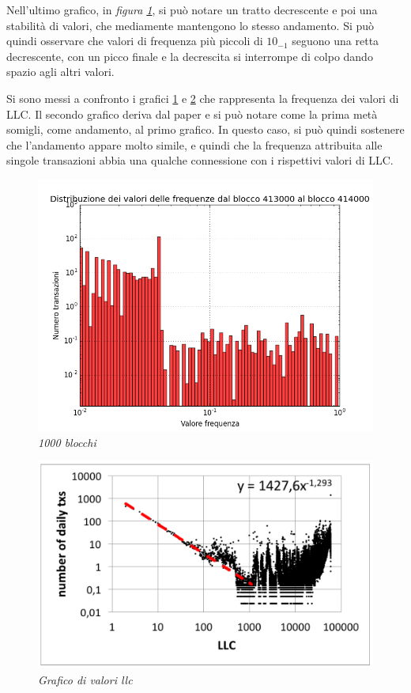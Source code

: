 Nell'ultimo grafico, in \textit{figura \ref{fig:hist1000b}}, si può notare un tratto decrescente e poi una stabilità di valori, che mediamente mantengono lo stesso andamento. Si può quindi osservare che valori di frequenza più piccoli di $10_{-1}$ seguono una retta decrescente, con un picco finale e la decrescita si interrompe di colpo dando spazio agli altri valori.

Si sono messi a confronto i grafici \ref{fig:hist1000b} e \ref{graphpaper} che rappresenta la frequenza dei valori di LLC. Il secondo grafico deriva dal paper \cite{ddp-ltcbh-17} e si può notare come la prima metà somigli, come andamento, al primo grafico. In questo caso, si può quindi sostenere che l'andamento appare molto simile, e quindi che la frequenza attribuita alle singole transazioni abbia una qualche connessione con i rispettivi valori di LLC.

\begin{figure}[htbp]
	\centering
	\includegraphics[width=\textwidth]{figure/hist1000b}
	\caption{\textit{1000 blocchi}\label{fig:hist1000b}}
\end{figure}

\begin{figure}
	\centering
	\includegraphics[width=0.6 \textwidth]{figure/graphpaper}
	\caption{\textit{Grafico di valori llc \cite{ddp-ltcbh-17} }\label{graphpaper}}
\end{figure}

